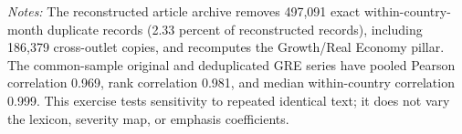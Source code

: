 \begin{table}[htbp]
\centering\small
\caption{Article-level exact-text deduplication sensitivity at the one-month horizon}
\label{tab:dedup_gre}
\vspace{0.35em}
\begin{minipage}{0.97\textwidth}\footnotesize\textit{Notes:} The reconstructed article archive removes 497,091 exact within-country-month duplicate records (2.33 percent of reconstructed records), including 186,379 cross-outlet copies, and recomputes the Growth/Real Economy pillar. The common-sample original and deduplicated GRE series have pooled Pearson correlation 0.969, rank correlation 0.981, and median within-country correlation 0.999. This exercise tests sensitivity to repeated identical text; it does not vary the lexicon, severity map, or emphasis coefficients.\end{minipage}
\end{table}
